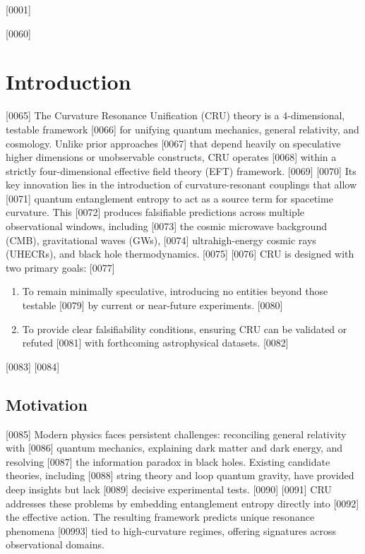 [0001] \documentclass[12pt]{report}
[0002] \usepackage[utf8]{inputenc}
\begin{document}
[0060] \maketitle
[0061] \tableofcontents
[0062] \newpage
[0063] 
[0064] \chapter{Introduction}
[0065] The Curvature Resonance Unification (CRU) theory is a 4-dimensional, testable framework 
[0066] for unifying quantum mechanics, general relativity, and cosmology. Unlike prior approaches 
[0067] that depend heavily on speculative higher dimensions or unobservable constructs, CRU operates 
[0068] within a strictly four-dimensional effective field theory (EFT) framework. 
[0069] 
[0070] Its key innovation lies in the introduction of curvature-resonant couplings that allow 
[0071] quantum entanglement entropy to act as a source term for spacetime curvature. This 
[0072] produces falsifiable predictions across multiple observational windows, including 
[0073] the cosmic microwave background (CMB), gravitational waves (GWs), 
[0074] ultrahigh-energy cosmic rays (UHECRs), and black hole thermodynamics. 
[0075] 
[0076] CRU is designed with two primary goals:
[0077] \begin{enumerate}
[0078]   \item To remain minimally speculative, introducing no entities beyond those testable 
[0079]         by current or near-future experiments.
[0080]   \item To provide clear falsifiability conditions, ensuring CRU can be validated or refuted 
[0081]         with forthcoming astrophysical datasets.
[0082] \end{enumerate}
[0083] 
[0084] \section{Motivation}
[0085] Modern physics faces persistent challenges: reconciling general relativity with 
[0086] quantum mechanics, explaining dark matter and dark energy, and resolving 
[0087] the information paradox in black holes. Existing candidate theories, including 
[0088] string theory and loop quantum gravity, have provided deep insights but lack 
[0089] decisive experimental tests. 
[0090] 
[0091] CRU addresses these problems by embedding entanglement entropy directly into 
[0092] the effective action. The resulting framework predicts unique resonance phenomena 
[00993] tied to high-curvature regimes, offering signatures across observational domains. 
\end{document}
